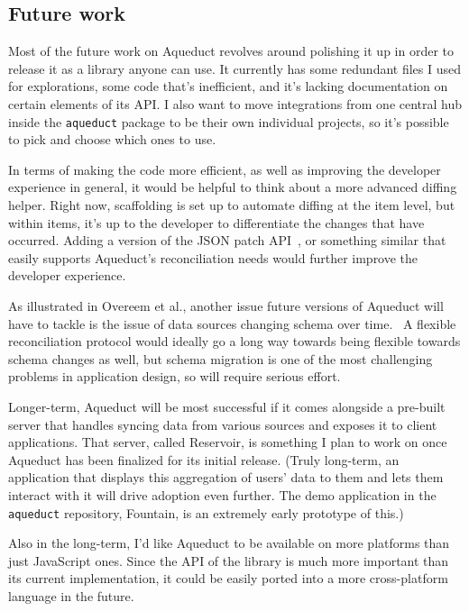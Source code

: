 \documentclass[manuscript,review,anonymous]{acmart}
\begin{document}
\subsection{Future work}
Most of the future work on Aqueduct revolves around polishing it up in order to release it as a library anyone can use. It currently has some redundant files I used for explorations, some code that's inefficient, and it's lacking documentation on certain elements of its API. I also want to move integrations from one central hub inside the \texttt{aqueduct} package to be their own individual projects, so it's possible to pick and choose which ones to use. 

In terms of making the code more efficient, as well as improving the developer experience in general, it would be helpful to think about a more advanced diffing helper. Right now, scaffolding is set up to automate diffing at the item level, but within items, it's up to the developer to differentiate the changes that have occurred. Adding a version of the JSON patch API~\cite{caoJSONPatchTurning2016}, or something similar that easily supports Aqueduct's reconciliation needs would further improve the developer experience.

As illustrated in Overeem et al., another issue future versions of Aqueduct will have to tackle is the issue of data sources changing schema over time.~\cite{overeemDarkSideEvent2017} A flexible reconciliation protocol would ideally go a long way towards being flexible towards schema changes as well, but schema migration is one of the most challenging problems in application design, so will require serious effort.

Longer-term, Aqueduct will be most successful if it comes alongside a pre-built server that handles syncing data from various sources and exposes it to client applications. That server, called Reservoir, is something I plan to work on once Aqueduct has been finalized for its initial release. (Truly long-term, an application that displays this aggregation of users' data to them and lets them interact with it will drive adoption even further. The demo application in the \texttt{aqueduct} repository, Fountain, is an extremely early prototype of this.)

Also in the long-term, I'd like Aqueduct to be available on more platforms than just JavaScript ones. Since the API of the library is much more important than its current implementation, it could be easily ported into a more cross-platform language in the future.
\end{document}
